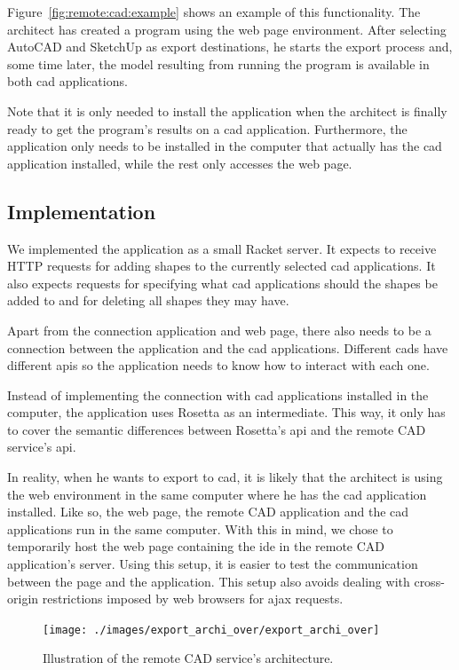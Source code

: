 Figure~\ref{fig:remote:cad:example} shows an example of this functionality.
The architect has created a program using the web page environment.
After selecting AutoCAD and SketchUp as export destinations, he starts the export process and, some time later, the model resulting from running the program is available in both \gls{cad} applications.

Note that it is only needed to install the application when the architect is finally ready to get the program's results on a \gls{cad} application.
Furthermore, the application only needs to be installed in the computer that actually has the \gls{cad} application installed, while the rest only accesses the web page.


\subsection{Implementation}
We implemented the application as a small Racket server.
It expects to receive HTTP requests for adding shapes to the currently selected \gls{cad} applications.
It also expects requests for specifying what \gls{cad} applications should the shapes be added to and for deleting all shapes they may have.

Apart from the connection application and web page, there also needs to be a connection between the application and the \gls{cad} applications.
Different \glspl{cad} have different \glspl{api} so the application needs to know how to interact with each one.

Instead of implementing the connection with \gls{cad} applications installed in the computer, the application uses Rosetta as an intermediate.
This way, it only has to cover the semantic differences between Rosetta's \gls{api} and the remote CAD service's \gls{api}.

In reality, when he wants to export to \gls{cad}, it is likely that the architect is using the web environment in the same computer where he has the \gls{cad} application installed.
Like so, the web page, the remote CAD application and the \gls{cad} applications run in the same computer.
With this in mind, we chose to temporarily host the web page containing the \gls{ide} in the remote CAD application's server.
Using this setup, it is easier to test the communication between the page and the application.
This setup also avoids dealing with cross-origin restrictions imposed by web browsers for \gls{ajax} requests.

\begin{figure}
  \centering
  \texttt{[image: ./images/export\_archi\_over/export\_archi\_over]}
  \caption{Illustration of the remote CAD service's architecture.}
  \label{fig:remote:cad:archi}
\end{figure}



